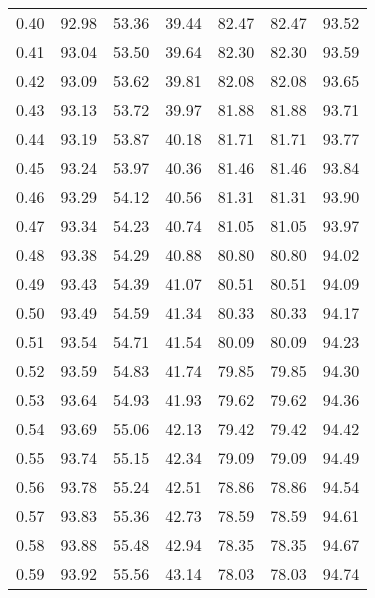\begin{tabular}{|c|c|c|c|c|c|c|}
      0.40 &     92.98 &     53.36 &      39.44 &   82.47 &      82.47 &         93.52 \\
      0.41 &     93.04 &     53.50 &      39.64 &   82.30 &      82.30 &         93.59 \\
      0.42 &     93.09 &     53.62 &      39.81 &   82.08 &      82.08 &         93.65 \\
      0.43 &     93.13 &     53.72 &      39.97 &   81.88 &      81.88 &         93.71 \\
      0.44 &     93.19 &     53.87 &      40.18 &   81.71 &      81.71 &         93.77 \\
      0.45 &     93.24 &     53.97 &      40.36 &   81.46 &      81.46 &         93.84 \\
      0.46 &     93.29 &     54.12 &      40.56 &   81.31 &      81.31 &         93.90 \\
      0.47 &     93.34 &     54.23 &      40.74 &   81.05 &      81.05 &         93.97 \\
      0.48 &     93.38 &     54.29 &      40.88 &   80.80 &      80.80 &         94.02 \\
      0.49 &     93.43 &     54.39 &      41.07 &   80.51 &      80.51 &         94.09 \\
      0.50 &     93.49 &     54.59 &      41.34 &   80.33 &      80.33 &         94.17 \\
      0.51 &     93.54 &     54.71 &      41.54 &   80.09 &      80.09 &         94.23 \\
      0.52 &     93.59 &     54.83 &      41.74 &   79.85 &      79.85 &         94.30 \\
      0.53 &     93.64 &     54.93 &      41.93 &   79.62 &      79.62 &         94.36 \\
      0.54 &     93.69 &     55.06 &      42.13 &   79.42 &      79.42 &         94.42 \\
      0.55 &     93.74 &     55.15 &      42.34 &   79.09 &      79.09 &         94.49 \\
      0.56 &     93.78 &     55.24 &      42.51 &   78.86 &      78.86 &         94.54 \\
      0.57 &     93.83 &     55.36 &      42.73 &   78.59 &      78.59 &         94.61 \\
      0.58 &     93.88 &     55.48 &      42.94 &   78.35 &      78.35 &         94.67 \\
      0.59 &     93.92 &     55.56 &      43.14 &   78.03 &      78.03 &         94.74 \\

\end{tabular}
